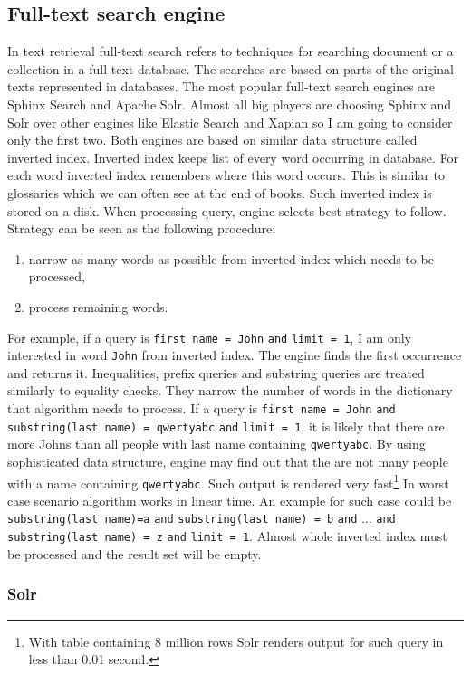 \documentclass[10pt,a4paper]{article}
\begin{document}
\subsection{Full-text search engine}
In text retrieval full-text search refers to techniques for searching document or a collection in a full text database. The searches are based on parts of the original texts represented in databases. The most popular full-text search engines are Sphinx Search and Apache Solr. Almost all big players are choosing Sphinx and Solr over other engines like Elastic Search and Xapian so I am going to consider only the first two. Both engines are based on similar data structure called inverted index. Inverted index keeps list of every word occurring in database. For each word inverted index remembers where this word occurs. This is similar to glossaries which we can often see at the end of books. Such inverted index is stored on a disk. When processing query, engine selects best strategy to follow. Strategy can be seen as the following procedure:
\begin{enumerate}
\item narrow as many words as possible from inverted index which needs to be processed, 
\item process remaining words. 
\end{enumerate}
For example, if a query is \verb|first name = John| \verb|and| \verb|limit = 1|, I am only interested in word \verb|John| from inverted index. The engine finds the first occurrence and returns it. Inequalities, prefix queries and substring queries are treated similarly to equality checks. They narrow the number of words in the dictionary that algorithm needs to process. If a query is \verb|first name = John| \verb|and| \verb|substring(last name) = qwertyabc| \verb|and| \verb|limit = 1|, it is likely that there are more Johns than all people with last name containing \verb|qwertyabc|. By using sophisticated data structure, engine may find out that the are not many people with a name containing \verb|qwertyabc|. Such output is rendered very fast\footnote{With table containing 8 million rows Solr renders output for such query in less than 0.01 second.} In worst case scenario algorithm works in linear time. An example for such case could be \verb|substring(last name)=a| \verb|and| \verb|substring(last name) = b| \verb|and| ... \verb|and| \verb|substring(last name) = z| \verb|and| \verb|limit = 1|. Almost whole inverted index must be processed and the result set will be empty.

\subsubsection{Solr}
\end{document}
